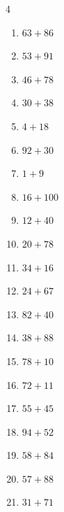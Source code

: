 \begin{multicols}{4}
\begin{enumerate}
  \item $63+86$
        \phantom{$=149$}

  \item $53+91$
        \phantom{$=144$}

  \item $46+78$
        \phantom{$=124$}

  \item $30+38$
        \phantom{$=68$}

  \item $4+18$
        \phantom{$=22$}

  \item $92+30$
        \phantom{$=122$}

  \item $1+9$
        \phantom{$=10$}

  \item $16+100$
        \phantom{$=116$}

  \item $12+40$
        \phantom{$=52$}

  \item $20+78$
        \phantom{$=98$}

  \item $34+16$
        \phantom{$=50$}

  \item $24+67$
        \phantom{$=91$}

  \item $82+40$
        \phantom{$=122$}

  \item $38+88$
        \phantom{$=126$}

  \item $78+10$
        \phantom{$=88$}

  \item $72+11$
        \phantom{$=83$}

\columnbreak %

  \item $55+45$
        \phantom{$=100$}

  \item $94+52$
        \phantom{$=146$}

  \item $58+84$
        \phantom{$=142$}

  \item $57+88$
        \phantom{$=145$}

  \item $31+71$
        \phantom{$=102$}


\end{enumerate}
\end{multicols}
